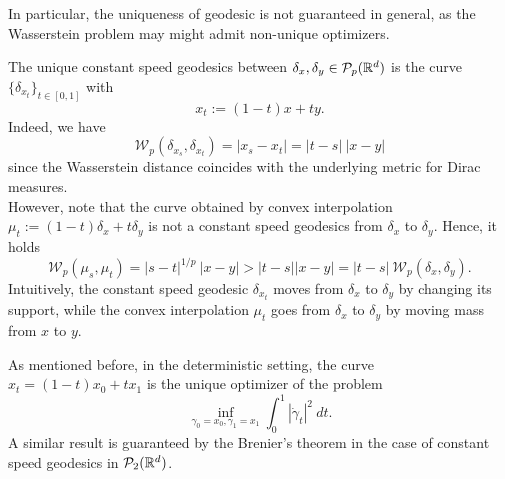 \documentclass[../main.tex]{subfiles}
\begin{document}
\begin{remark}
    In particular, the uniqueness of geodesic is not guaranteed in general, as the Wasserstein problem may might admit non-unique optimizers.
\end{remark}

\begin{example}
    The unique constant speed geodesics between $\delta_x, \delta_y \in \mathcal{P}_p(\mathbb{R}^d)$ is the curve $\{\delta_{x_t}\}_{t\in[0,1]}$ with
    $$
    x_t := (1-t)x + ty.
    $$
    Indeed, we have
    $$
    \mathcal{W}_p(\delta_{x_s}, \delta_{x_t}) = |x_s - x_t| = |t-s| \ |x - y|
    $$
    since the Wasserstein distance coincides with the underlying metric for Dirac measures. \\
    However, note that the curve obtained by convex interpolation $\mu_t := (1-t)\delta_{x} + t\delta_y$ is not a constant speed geodesics from $\delta_x$ to $\delta_y$. Hence, it holds
    $$
    \mathcal{W}_p(\mu_s, \mu_t) = |s-t|^{1/p} \ |x - y| > |t-s| |x-y| = |t-s| \ \mathcal{W}_p(\delta_x, \delta_y). 
    $$
    Intuitively, the constant speed geodesic $\delta_{x_t}$ moves from $\delta_x$ to $\delta_y$ by changing its support, while the convex interpolation $\mu_t$ goes from $\delta_x$ to $\delta_y$ by moving mass from $x$ to $y$.
\end{example}

As mentioned before, in the deterministic setting, the curve $x_t = (1-t)x_0 + tx_1$ is the unique optimizer of the problem
$$
\inf_{\gamma_0=x_0, \gamma_1=x_1}\int_0^1 |\dot \gamma_t|^2 \ dt.
$$
A similar result is guaranteed by the Brenier's theorem in the case of constant speed geodesics in $\mathcal{P}_2(\mathbb{R}^d)$.
\end{document}
